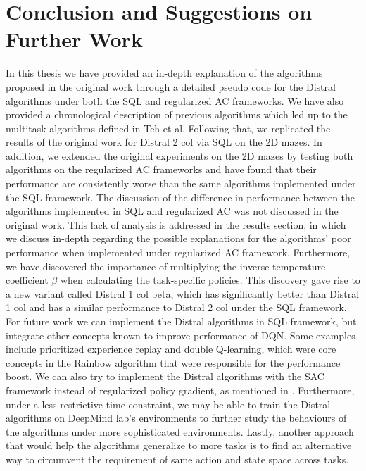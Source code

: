 \documentclass[12pt]{report}
\begin{document}






\chapter{Conclusion and Suggestions on Further Work}

In this thesis we have provided an in-depth explanation of the algorithms proposed in the original work through a detailed pseudo code for the Distral algorithms under both the SQL and regularized AC frameworks. We have also provided a chronological description of previous algorithms which led up to the multitask algorithms defined in Teh et al. Following that, we replicated the results of the original work for Distral 2 col via SQL on the 2D mazes. In addition, we extended the original experiments on the 2D mazes by testing both algorithms on the regularized AC frameworks and have found that their performance are consistently worse than the same algorithms implemented under the SQL framework. The discussion of the difference in performance between the algorithms implemented in SQL and regularized AC was not discussed in the original work. This lack of analysis is addressed in the results section, in which we discuss in-depth regarding the possible explanations for the algorithms' poor performance when implemented under regularized AC framework. Furthermore, we have discovered the importance of multiplying the inverse temperature coefficient $\beta$ when calculating the task-specific policies. This discovery gave rise to a new variant called Distral 1 col beta, which has significantly better than Distral 1 col and has a similar performance to Distral 2 col under the SQL framework.\\

For future work we can implement the Distral algorithms in SQL framework, but integrate other concepts known to improve performance of DQN. Some examples include prioritized experience replay and double Q-learning, which were core concepts in the Rainbow algorithm \cite{hessel2018rainbow} that were responsible for the performance boost. We can also try to implement the Distral algorithms with the SAC framework instead of regularized policy gradient, as mentioned in \cite{haarnoja2018soft}.
Furthermore, under a less restrictive time constraint, we may be able to train the Distral algorithms on DeepMind lab's environments to further study the behaviours of the algorithms under more sophisticated environments. Lastly, another approach that would help the algorithms generalize to more tasks is to find an alternative way to circumvent the requirement of same action and state space across tasks.
\end{document}
